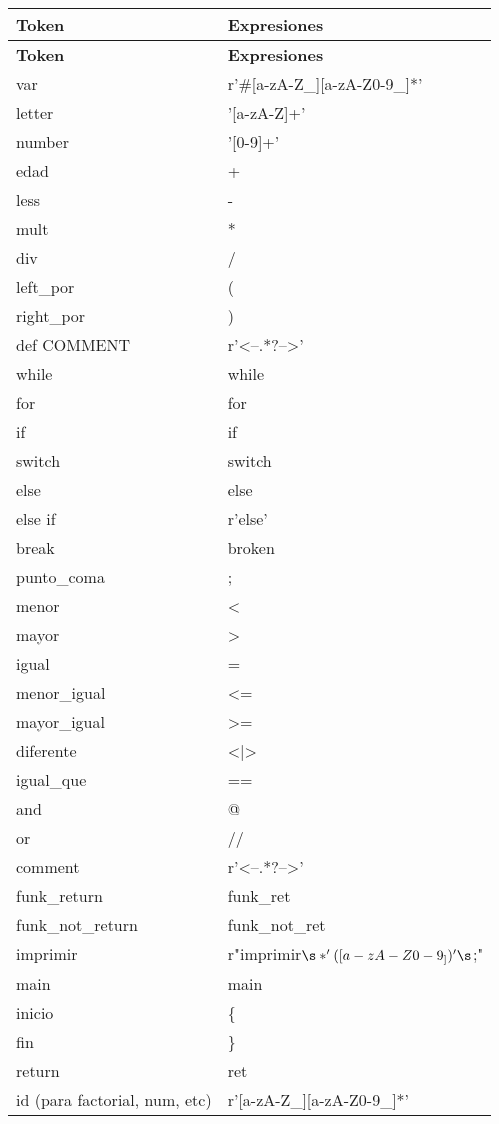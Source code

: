 \documentclass{article}
\begin{document}
\begin{longtable}{|l|l|}
    \hline
    \textbf{Token} & \textbf{Expresiones} \\
    \hline
    \endfirsthead

    \hline
    \textbf{Token} & \textbf{Expresiones} \\
    \hline
    \endhead

    \hline
    \endfoot

    \hline
    \endlastfoot

    var & r'\#[a-zA-Z\_][a-zA-Z0-9\_]*' \\ \hline
    letter & '[a-zA-Z]+' \\ \hline
    number & '[0-9]+' \\ \hline
    edad & + \\ \hline
    less & - \\ \hline
    mult & * \\ \hline
    div & / \\ \hline
    left\_por & ( \\ \hline
    right\_por & ) \\ \hline
    def COMMENT & r'\textless--.*?--\textgreater' \\ \hline
    while & while \\ \hline
    for & for \\ \hline
    if & if \\ \hline
    switch & switch \\ \hline
    else & else \\ \hline
    else if & r'else' \\ \hline
    break & broken \\ \hline
    punto\_coma & ; \\ \hline
    menor & \textless \\ \hline
    mayor & \textgreater \\ \hline
    igual & = \\ \hline
    menor\_igual & \textless= \\ \hline
    mayor\_igual & \textgreater= \\ \hline
    diferente & \textless|\textgreater \\ \hline
    igual\_que & == \\ \hline
    and & @ \\ \hline
    or & // \\ \hline
    comment & r'\textless--.*?--\textgreater' \\ \hline
    funk\_return & funk\_ret \\ \hline
    funk\_not\_return & funk\_not\_ret \\ \hline
    imprimir & r"imprimir\s*\(\s*'([a-zA-Z0-9_ ])'\s\)\s*;" \\ \hline
    main & main \\ \hline
    inicio & \{ \\ \hline
    fin & \} \\ \hline
    return & ret \\ \hline
    id (para factorial, num, etc) & r'[a-zA-Z\_][a-zA-Z0-9\_]*' \\ \hline
\end{longtable}
\end{document}

